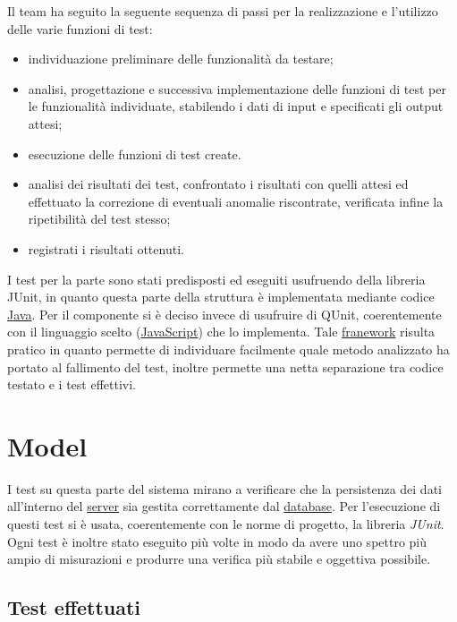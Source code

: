 Il team ha seguito la seguente sequenza di passi per la realizzazione e l'utilizzo delle varie funzioni di test:
\begin{itemize}
\item individuazione preliminare delle funzionalità da testare;
\item analisi, progettazione e successiva implementazione delle funzioni di test per le funzionalità individuate, stabilendo i dati di input e specificati gli output attesi;
\item esecuzione delle funzioni di test create.
\item analisi dei risultati dei test, confrontato i risultati con quelli attesi ed effettuato la correzione di eventuali anomalie riscontrate, verificata infine la ripetibilità del test stesso;
\item registrati i risultati ottenuti.
\end{itemize}

I test per la parte  sono stati predisposti ed eseguiti usufruendo della libreria JUnit, in quanto questa parte della struttura è implementata mediante codice \underline{Java}.
Per il componente  si è deciso invece di usufruire di QUnit, coerentemente con il linguaggio scelto (\underline{JavaScript}) che lo implementa. Tale \underline{franework} risulta pratico in quanto permette di individuare facilmente quale metodo analizzato ha portato al fallimento del test, inoltre permette una netta separazione tra codice testato e i test effettivi.

\section{Model}
I test su questa parte del sistema mirano a verificare che la persistenza dei dati all'interno del \underline{server} sia gestita correttamente dal \underline{database}.
Per l'esecuzione di questi test si è usata, coerentemente con le norme di progetto, la libreria \textit{JUnit}.
Ogni test è inoltre stato eseguito più volte in modo da avere uno spettro più ampio di misurazioni e produrre una verifica più stabile e oggettiva possibile.
\subsection{Test effettuati}
